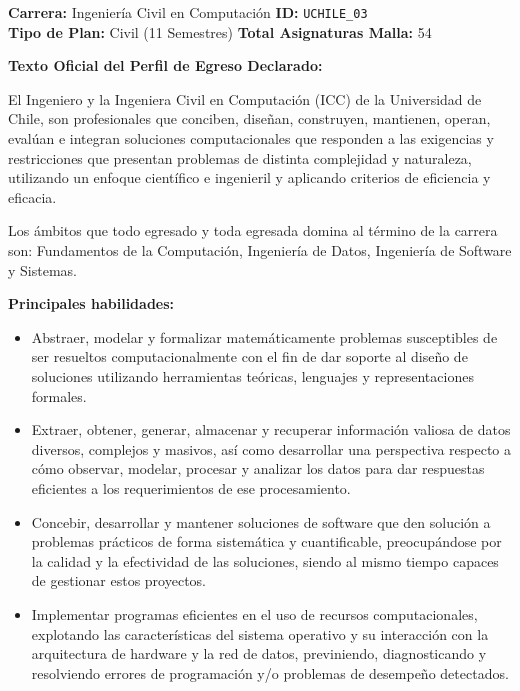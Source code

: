\documentclass[11pt,a4paper]{article}
\begin{document}
\newpage

\begin{tcolorbox}[fichaStyle, title={UNIVERSIDAD 03: Universidad de Chile (UCHILE)}]
\small\sffamily
\textbf{Carrera:} Ingeniería Civil en Computación \hfill \textbf{ID:} \texttt{UCHILE\_03} \\
\textbf{Tipo de Plan:} Civil (11 Semestres) \hfill \textbf{Total Asignaturas Malla:} 54

\tcbline

\textbf{Texto Oficial del Perfil de Egreso Declarado:}\\[4pt]
{\small\rmfamily
El Ingeniero y la Ingeniera Civil en Computación (ICC) de la Universidad de Chile, son profesionales que conciben, diseñan, construyen, mantienen, operan, evalúan e integran soluciones computacionales que responden a las exigencias y restricciones que presentan problemas de distinta complejidad y naturaleza, utilizando un enfoque científico e ingenieril y aplicando criterios de eficiencia y eficacia.

\vspace{4pt}
Los ámbitos que todo egresado y toda egresada domina al término de la carrera son: Fundamentos de la Computación, Ingeniería de Datos, Ingeniería de Software y Sistemas.

\vspace{4pt}\noindent\textbf{Principales habilidades:}
\begin{itemize}[noitemsep, leftmargin=*]
    \item Abstraer, modelar y formalizar matemáticamente problemas susceptibles de ser resueltos computacionalmente con el fin de dar soporte al diseño de soluciones utilizando herramientas teóricas, lenguajes y representaciones formales.
    \item Extraer, obtener, generar, almacenar y recuperar información valiosa de datos diversos, complejos y masivos, así como desarrollar una perspectiva respecto a cómo observar, modelar, procesar y analizar los datos para dar respuestas eficientes a los requerimientos de ese procesamiento.
    \item Concebir, desarrollar y mantener soluciones de software que den solución a problemas prácticos de forma sistemática y cuantificable, preocupándose por la calidad y la efectividad de las soluciones, siendo al mismo tiempo capaces de gestionar estos proyectos.
    \item Implementar programas eficientes en el uso de recursos computacionales, explotando las características del sistema operativo y su interacción con la arquitectura de hardware y la red de datos, previniendo, diagnosticando y resolviendo errores de programación y/o problemas de desempeño detectados.
\end{itemize}
}
\end{tcolorbox}
\end{document}

